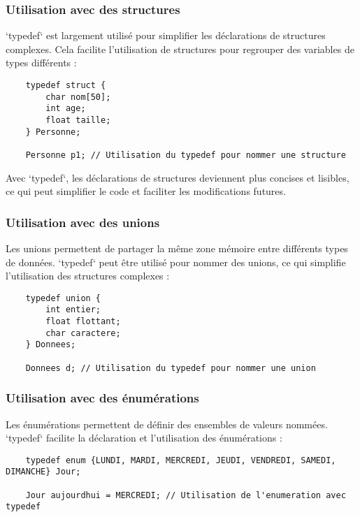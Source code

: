 \subsubsection*{Utilisation avec des structures}

`typedef` est largement utilisé pour simplifier les déclarations de structures complexes. Cela facilite l'utilisation de structures pour regrouper des variables de types différents :

\begin{lstlisting}
	typedef struct {
		char nom[50];
		int age;
		float taille;
	} Personne;
	
	Personne p1; // Utilisation du typedef pour nommer une structure
\end{lstlisting}

Avec `typedef`, les déclarations de structures deviennent plus concises et lisibles, ce qui peut simplifier le code et faciliter les modifications futures.

\subsubsection*{Utilisation avec des unions}

Les unions permettent de partager la même zone mémoire entre différents types de données. `typedef` peut être utilisé pour nommer des unions, ce qui simplifie l'utilisation des structures complexes :

\begin{lstlisting}
	typedef union {
		int entier;
		float flottant;
		char caractere;
	} Donnees;
	
	Donnees d; // Utilisation du typedef pour nommer une union
\end{lstlisting}

\subsubsection*{Utilisation avec des énumérations}

Les énumérations permettent de définir des ensembles de valeurs nommées. `typedef` facilite la déclaration et l'utilisation des énumérations :

\begin{lstlisting}
	typedef enum {LUNDI, MARDI, MERCREDI, JEUDI, VENDREDI, SAMEDI, DIMANCHE} Jour;
	
	Jour aujourdhui = MERCREDI; // Utilisation de l'enumeration avec typedef
\end{lstlisting}

